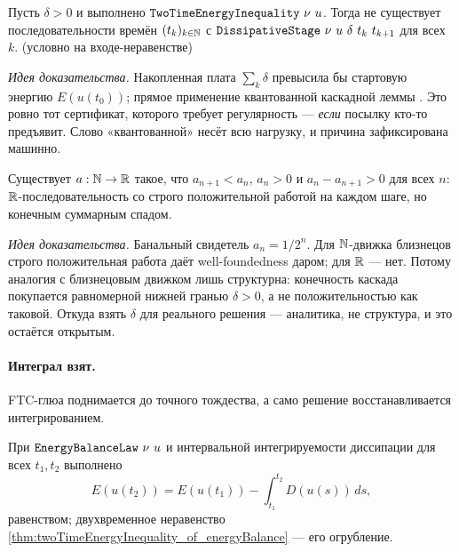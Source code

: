 \begin{theorem}\label{thm:ns_no_infinite_dissipative_cascade}
Пусть $\delta > 0$ и выполнено $\code{TwoTimeEnergyInequality}\ \nu\ u$. Тогда не существует
последовательности времён $(t_k)_{k\in\mathbb{N}}$ с $\code{DissipativeStage}\ \nu\ u\ \delta\ t_k\ t_{k+1}$
для всех $k$. \green{} (условно на входе-неравенстве)
\end{theorem}

\emph{Идея доказательства.} Накопленная плата $\sum_k \delta$ превысила бы стартовую энергию
$E(u(t_0))$; прямое применение квантованной каскадной леммы
. Это ровно тот сертификат, которого требует
регулярность --- \emph{если} посылку кто-то предъявит. Слово «квантованной» несёт всю нагрузку, и
причина зафиксирована машинно.

\begin{theorem}\label{thm:real_positive_work_not_wellfounded}
Существует $a : \mathbb{N} \to \mathbb{R}$ такое, что $a_{n+1} < a_n$, $a_n > 0$ и $a_n - a_{n+1} > 0$ для всех $n$:
$\mathbb{R}$-последовательность со строго положительной работой на каждом шаге, но конечным суммарным спадом.
\green{}
\end{theorem}

\emph{Идея доказательства.} Банальный свидетель $a_n = 1/2^n$. Для $\mathbb{N}$-движка близнецов строго
положительная работа даёт well-foundedness даром; для $\mathbb{R}$ --- нет. Потому аналогия с близнецовым
движком лишь структурна: конечность каскада покупается равномерной нижней гранью $\delta > 0$, а не
положительностью как таковой. Откуда взять $\delta$ для реального решения --- аналитика, не
структура, и это остаётся открытым.

\paragraph{Интеграл взят.}
FTC-глюа поднимается до точного тождества, а само решение восстанавливается интегрированием.

\begin{theorem}\label{thm:energy_identity_of_energyBalance}
При $\texttt{EnergyBalanceLaw}\ \nu\ u$ и интервальной интегрируемости диссипации для всех $t_1,t_2$
выполнено
\begin{equation}\label{eq:ns-energy-identity}
E(u(t_2)) = E(u(t_1)) - \int_{t_1}^{t_2} D(u(s))\,ds,
\end{equation}
равенством; двухвременное неравенство
\cref{thm:twoTimeEnergyInequality_of_energyBalance} --- его огрубление. \green{}
\end{theorem}

